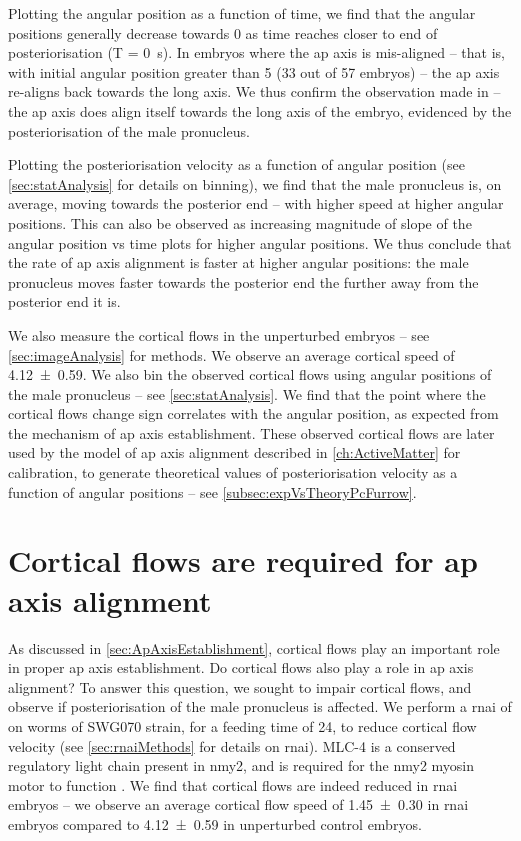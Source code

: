 Plotting the angular position as a function of time, we find that the angular positions generally decrease towards \SI{0}{\unitAngle} as time reaches closer to end of posteriorisation (T = \SI{0}{\second}). In embryos where the \ac{ap} axis is mis-aligned -- that is, with initial angular position greater than \SI{5}{\unitAngle} (\num{33} out of \num{57} embryos) -- the \ac{ap} axis re-aligns back towards the long axis. We thus confirm the observation made in \cite{goldstein1996specification} -- the \ac{ap} axis does align itself towards the long axis of the embryo, evidenced by the posteriorisation of the male pronucleus.

Plotting the posteriorisation velocity as a function of angular position (see \autoref{sec:statAnalysis} for details on binning), we find that the male pronucleus is, on average, moving towards the posterior end -- with higher speed at higher angular positions. This can also be observed as increasing magnitude of slope of the angular position vs time plots for higher angular positions. We thus conclude that the rate of \ac{ap} axis alignment is faster at higher angular positions: the male pronucleus moves faster towards the posterior end the further away from the posterior end it is.

We also measure the cortical flows in the unperturbed embryos -- see \autoref{sec:imageAnalysis} for methods. We observe an average cortical speed of \SI{4.12 +- 0.59}{\unitCrtxVel}. We also bin the observed cortical flows using angular positions of the male pronucleus -- see \autoref{sec:statAnalysis}. We find that the point where the cortical flows change sign correlates with the angular position, as expected from the mechanism of \ac{ap} axis establishment. These observed cortical flows are later used by the model of \ac{ap} axis alignment described in \autoref{ch:ActiveMatter} for calibration, to generate theoretical values of posteriorisation velocity as a function of angular positions -- see \autoref{subsec:expVsTheoryPcFurrow}.

\section{Cortical flows are required for \acs{ap} axis alignment}\label{sec:corticalFlowsRoleMlc4}
As discussed in \autoref{sec:ApAxisEstablishment}, cortical flows play an important role in proper \ac{ap} axis establishment. Do cortical flows also play a role in \ac{ap} axis alignment? To answer this question, we sought to impair cortical flows, and observe if posteriorisation of the male pronucleus is affected. We perform a \ac{rnai} of  on worms of SWG070 strain, for a feeding time of \SI{24}{\unitRNAiTime}, to reduce cortical flow velocity (see \autoref{sec:rnaiMethods} for details on \ac{rnai}). MLC-4 is a conserved regulatory light chain present in \ac{nmy2}, and is required for the \ac{nmy2} myosin motor to function \citep{shelton1999nonmuscle}. We find that cortical flows are indeed reduced in  \ac{rnai} embryos -- we observe an average cortical flow speed of \SI{1.45 +- 0.30}{\unitCrtxVel} in  \ac{rnai} embryos compared to \SI{4.12 +- 0.59}{\unitCrtxVel} in unperturbed control embryos.


